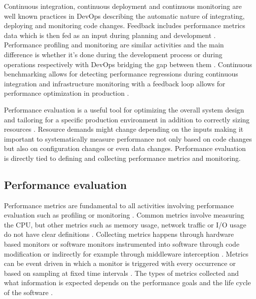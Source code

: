 Continuous integration, continuous deployment and continuous monitoring are well known practices in DevOps \parencite{wallerIncludingPerformanceBenchmarks2015} describing the automatic nature of integrating, deploying and monitoring code changes. Feedback includes performance metrics data which is then fed as an input during planning and development \parencite{smedsDevOpsDefinitionPerceived2015}. Performance profiling and monitoring are similar activities and the main difference is whether it's done during the development process or during operations respectively \parencite{wallerIncludingPerformanceBenchmarks2015} with DevOps bridging the gap between them \parencite{brunnertPerformanceorientedDevOpsResearch2015}. Continuous benchmarking allows for detecting performance regressions during continuous integration \parencite{wallerIncludingPerformanceBenchmarks2015} and infrastructure monitoring with a feedback loop allows for performance optimization in production \parencite{smedsDevOpsDefinitionPerceived2015}.

Performance evaluation is a useful tool for optimizing the overall system design and tailoring for a specific production environment in addition to correctly sizing resources \parencite{brunnertPerformanceorientedDevOpsResearch2015,wallerIncludingPerformanceBenchmarks2015}. Resource demands might change depending on the inputs \parencite{brunnertPerformanceorientedDevOpsResearch2015} making it important to systematically measure performance not only based on code changes but also on configuration changes or even data changes. Performance evaluation is directly tied to defining and collecting performance metrics and monitoring.

\subsection{Performance evaluation}

Performance metrics are fundamental to all activities involving performance evaluation such as profiling or monitoring \parencite{brunnertPerformanceorientedDevOpsResearch2015}. Common metrics involve measuring the CPU, but other metrics such as memory usage, network traffic or I/O usage do not have clear definitions \parencite{brunnertPerformanceorientedDevOpsResearch2015}. Collecting metrics happens through hardware based monitors or software monitors instrumented into software through code modification or indirectly for example through middleware interception \parencite{brunnertPerformanceorientedDevOpsResearch2015}. Metrics can be event driven in which a monitor is triggered with every occurrence or based on sampling at fixed time intervals \parencite{brunnertPerformanceorientedDevOpsResearch2015}. The types of metrics collected and what information is expected depends on the performance goals and the life cycle of the software \parencite{brunnertPerformanceorientedDevOpsResearch2015}.

